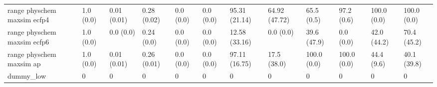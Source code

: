 \begin{tabular}{llllllllllll}
range physchem maxsim ecfp4 & {\cellcolor[HTML]{F6FCFD}} \color[HTML]{000000} 1.0 (0.0) & {\cellcolor[HTML]{F7FCFD}} \color[HTML]{000000} 0.01 (0.01) & {\cellcolor[HTML]{B7E4DA}} \color[HTML]{000000} 0.28 (0.02) & {\cellcolor[HTML]{F7FCFD}} \color[HTML]{000000} 0.0 (0.0) & {\cellcolor[HTML]{F7FCFD}} \color[HTML]{000000} 0.0 (0.0) & {\cellcolor[HTML]{005221}} \color[HTML]{F1F1F1} 95.31 (21.14) & {\cellcolor[HTML]{3BA76C}} \color[HTML]{F1F1F1} 64.92 (47.72) & {\cellcolor[HTML]{00441B}} \color[HTML]{F1F1F1} 65.5 (0.5) & {\cellcolor[HTML]{00441B}} \color[HTML]{F1F1F1} 97.2 (0.6) & {\cellcolor[HTML]{7DCCB5}} \color[HTML]{000000} 100.0 (0.0) & {\cellcolor[HTML]{8FD4C2}} \color[HTML]{000000} 100.0 (0.0) \\
range physchem maxsim ecfp6 & {\cellcolor[HTML]{F6FCFD}} \color[HTML]{000000} 1.0 (0.0) & {\cellcolor[HTML]{F6FCFD}} \color[HTML]{000000} 0.0 (0.0) & {\cellcolor[HTML]{CDECE6}} \color[HTML]{000000} 0.24 (0.0) & {\cellcolor[HTML]{F7FCFD}} \color[HTML]{000000} 0.0 (0.0) & {\cellcolor[HTML]{F7FCFD}} \color[HTML]{000000} 0.0 (0.0) & {\cellcolor[HTML]{E5F5F9}} \color[HTML]{000000} 12.58 (33.16) & {\cellcolor[HTML]{F7FCFD}} \color[HTML]{000000} 0.0 (0.0) & {\cellcolor[HTML]{00441B}} \color[HTML]{F1F1F1} 39.6 (47.9) & {\cellcolor[HTML]{00441B}} \color[HTML]{F1F1F1} 0.0 (0.0) & {\cellcolor[HTML]{77C9B0}} \color[HTML]{000000} 42.0 (44.2) & {\cellcolor[HTML]{319C5C}} \color[HTML]{F1F1F1} 70.4 (45.2) \\
range physchem maxsim ap & {\cellcolor[HTML]{F6FCFD}} \color[HTML]{000000} 1.0 (0.0) & {\cellcolor[HTML]{F6FCFD}} \color[HTML]{000000} 0.01 (0.01) & {\cellcolor[HTML]{C4E9E1}} \color[HTML]{000000} 0.26 (0.01) & {\cellcolor[HTML]{F7FCFD}} \color[HTML]{000000} 0.0 (0.0) & {\cellcolor[HTML]{F7FCFD}} \color[HTML]{000000} 0.0 (0.0) & {\cellcolor[HTML]{004D1F}} \color[HTML]{F1F1F1} 97.11 (16.75) & {\cellcolor[HTML]{DBF2F2}} \color[HTML]{000000} 17.5 (38.0) & {\cellcolor[HTML]{00441B}} \color[HTML]{F1F1F1} 100.0 (0.0) & {\cellcolor[HTML]{00441B}} \color[HTML]{F1F1F1} 100.0 (0.0) & {\cellcolor[HTML]{78CAB1}} \color[HTML]{000000} 44.4 (9.6) & {\cellcolor[HTML]{A7DDD1}} \color[HTML]{000000} 40.1 (39.8) \\
dummy_low & {\cellcolor[HTML]{F7FCFD}} \color[HTML]{000000} 0 & {\cellcolor[HTML]{F7FCFD}} \color[HTML]{000000} 0 & {\cellcolor[HTML]{F7FCFD}} \color[HTML]{000000} 0 & {\cellcolor[HTML]{F7FCFD}} \color[HTML]{000000} 0 & {\cellcolor[HTML]{F7FCFD}} \color[HTML]{000000} 0 & {\cellcolor[HTML]{F7FCFD}} \color[HTML]{000000} 0 & {\cellcolor[HTML]{F7FCFD}} \color[HTML]{000000} 0 & {\cellcolor[HTML]{F7FCFD}} \color[HTML]{000000} 0 & {\cellcolor[HTML]{F7FCFD}} \color[HTML]{000000} 0 & {\cellcolor[HTML]{F7FCFD}} \color[HTML]{000000} 0 & {\cellcolor[HTML]{F7FCFD}} \color[HTML]{000000} 0 \\

\end{tabular}

